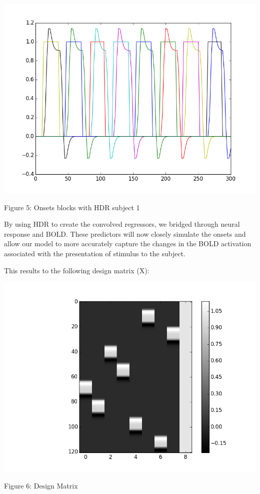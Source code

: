 \documentclass[12pt]{article}
\begin{document}
\begin{housevseverything}
    \centering
      \includegraphics[width=1\textwidth]{block_and_hdr}
    \caption{Figure 5: Onsets blocks with HDR subject 1}
\end{housevseverything}



		

By using HDR to create the convolved regressors, we bridged through neural 
response and BOLD. These predictors will now closely simulate the onsets and 
allow our model to more accurately capture the changes in the BOLD activation 
associated with the presentation of stimulus to the subject.

This results to the following design matrix (X):

\begin{housevseverything}
    \centering
      \includegraphics[width=1\textwidth]{desing_matrix}
    \caption{Figure 6: Design Matrix}
\end{housevseverything}
\end{document}
